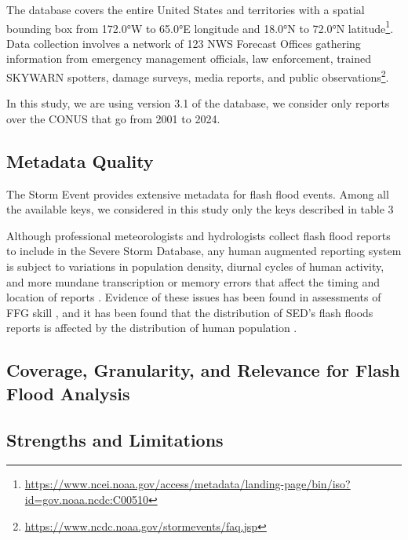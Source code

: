 The database covers the entire United States and territories with a spatial bounding box from 172.0°W to 65.0°E longitude and 18.0°N to 72.0°N latitude\footnote{\url{https://www.ncei.noaa.gov/access/metadata/landing-page/bin/iso?id=gov.noaa.ncdc:C00510}}. Data collection involves a network of 123 NWS Forecast Offices gathering information from emergency management officials, law enforcement, trained SKYWARN spotters, damage surveys, media reports, and public observations\footnote{\url{https://www.ncdc.noaa.gov/stormevents/faq.jsp}}.

In this study, we are using version 3.1 of the database, we consider only reports over the CONUS that go from 2001 to 2024.


\subsection{Metadata Quality}

The Storm Event provides extensive metadata for flash flood events. Among all the available keys, we considered in this study only the keys described in table 3





Although professional meteorologists and hydrologists collect flash flood reports to include in the Severe Storm Database, any human augmented reporting system is subject to variations in population density, diurnal cycles of human activity, and more mundane transcription or memory errors that affect the timing and location of reports \citep{Barthold_2015}. Evidence of these issues has been found in assessments of FFG skill \citep{Clark_2014}, and it has been found that the distribution of SED's flash floods reports is affected by the distribution of human population \cite{Marjerison_2016}. 



\subsection{Coverage, Granularity, and Relevance for Flash Flood Analysis}

\subsection{Strengths and Limitations}



































